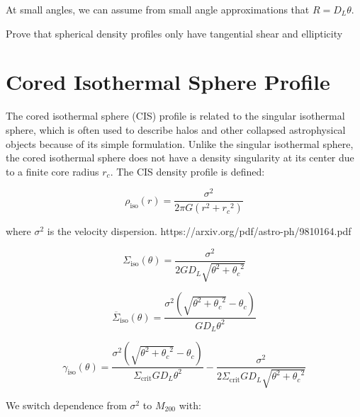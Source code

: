 \documentclass[10pt]{article}
\begin{document}
At small angles, we can assume from small angle approximations that $R = D_L \theta$.

Prove that spherical density profiles only have tangential shear and ellipticity


\section{Cored Isothermal Sphere Profile}
The cored isothermal sphere (CIS) profile is related to the singular isothermal sphere, which is often used to describe halos and other collapsed astrophysical objects because of its simple formulation. Unlike the singular isothermal sphere, the cored isothermal sphere does not have a density singularity at its center due to a finite core radius $r_c$. The CIS density profile is defined:

\begin{equation}
\rho_\mathrm{iso}(r) = \frac{\sigma^2}{2\pi G (r^2 + {r_c}^2)}
\end{equation}

where $\sigma^2$ is the velocity dispersion.
https://arxiv.org/pdf/astro-ph/9810164.pdf
%
%

\begin{equation}
\Sigma_\mathrm{iso}(\theta) = \frac{\sigma^2}{2 G D_L \sqrt{\theta^2 + {\theta_c}^2}}
\end{equation}

\begin{equation}
\overline{\Sigma}_\mathrm{iso}(\theta) = \frac{\sigma^2 \left(\sqrt{\theta^2 + {\theta_c}^2} - \theta_c \right)}{G D_L \theta^2}
\end{equation}

\begin{equation}
\gamma_\mathrm{iso}(\theta) = \frac{\sigma^2 \left(\sqrt{\theta^2 + {\theta_c}^2} - \theta_c \right)}{\Sigma_\mathrm{crit} G D_L \theta^2} - \frac{\sigma^2}{2 \Sigma_\mathrm{crit} G D_L \sqrt{\theta^2 + {\theta_c}^2}}
\end{equation}

We switch dependence from $\sigma^2$ to $M_{200}$ with:
\end{document}
